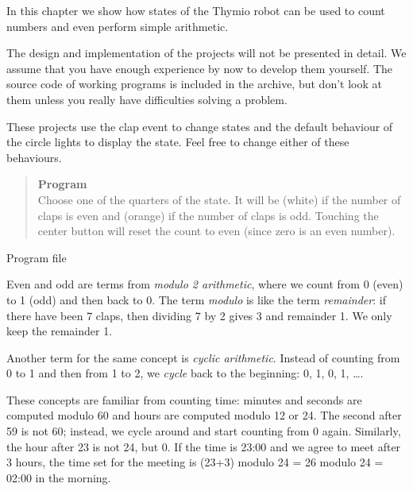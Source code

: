 \label{ch.counting}

In this chapter we show how states of the Thymio robot can be used to
count numbers and even perform simple arithmetic.

The design and implementation of the projects will not be presented
in detail. We assume that you have enough experience by now to develop
them yourself. The source code of working programs is included in the
archive, but don't look at them unless you really have difficulties
solving a problem.

These projects use the clap event  to change states
and the default behaviour of the circle lights to display the state.
Feel free to change either of these behaviours.




\begin{quote}
\textbf{Program}\\Choose one of the quarters of the state.
It will be  (white) if the number of claps
is even and  (orange) if the number of claps is odd.
Touching the center button will reset the count to even
(since zero is an even number).
\end{quote}

{\raggedleft \hfill Program file }

Even and odd are terms from \emph{modulo 2 arithmetic}, where we count
from 0 (even) to 1 (odd) and then back to 0. The term \emph{modulo} is
like the term \emph{remainder}: if there have been 7 claps, then
dividing 7 by 2 gives 3 and remainder 1. We only keep the remainder 1.

Another term for the same concept is \emph{cyclic arithmetic}.
Instead of counting from 0 to 1 and then from 1 to 2,
we \emph{cycle} back to the beginning:
0, 1, 0, 1, \ldots.

These concepts are familiar from counting time: minutes and seconds are
computed modulo 60 and hours are computed modulo 12 or 24. The second
after 59 is not 60; instead, we cycle around and start counting from 0
again. Similarly, the hour after 23 is not 24, but 0. If the time is
23:00 and we agree to meet after 3 hours, the time set for the meeting
is (23+3) modulo 24 = 26 modulo 24 = 02:00 in the morning.

